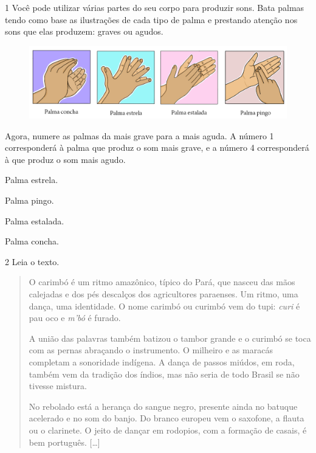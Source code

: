 \num{1} Você pode utilizar várias partes do seu corpo para produzir sons.
Bata palmas tendo como base as ilustrações de cada tipo de palma e
prestando atenção nos sons que elas produzem: graves ou agudos.

\begin{figure}[htpb!]
\includegraphics[width=\textwidth]{../ilustracoes/ART5/SAEB_5ANO_ART_FIGURA1.png}
\end{figure}

\noindent{}Agora, numere as palmas da mais grave para a mais aguda. A número 1
corresponderá à palma que produz o som mais grave, e a número 4 corresponderá à que
produz o som mais agudo.

\begin{minipage}{.5\textwidth}
\begin{boxlist}
 Palma estrela.

 Palma pingo.

 Palma estalada.

 Palma concha.
\end{boxlist}
\end{minipage}

\num{2}  Leia o texto.

\begin{quote}
O carimbó é um ritmo amazônico, típico do Pará, que nasceu das mãos
calejadas e dos pés descalços dos agricultores paraenses. Um ritmo, uma
dança, uma identidade. O nome carimbó ou curimbó vem do tupi:
\emph{curi} é pau oco e \emph{m'bó} é furado.

A união das palavras também batizou o tambor grande e o curimbó se toca
com as pernas abraçando o instrumento. O milheiro e as maracás completam
a sonoridade indígena. A dança de passos miúdos, em roda, também vem da
tradição dos índios, mas não seria de todo Brasil se não tivesse
mistura.

No rebolado está a herança do sangue negro, presente ainda no batuque
acelerado e no som do banjo. Do branco europeu vem o saxofone, a flauta
ou o clarinete. O jeito de dançar em rodopios, com a formação de casais,
é bem português.
{[}\ldots{}{]}
\end{quote}

